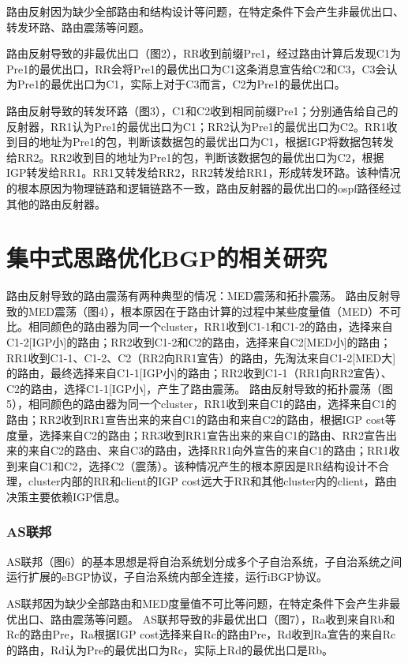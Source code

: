 \begin{itemize}
路由反射因为缺少全部路由和结构设计等问题，在特定条件下会产生非最优出口、转发环路、路由震荡等问题。

路由反射导致的非最优出口（图2），RR收到前缀Pre1，经过路由计算后发现C1为Pre1的最优出口，RR会将Pre1的最优出口为C1这条消息宣告给C2和C3，C3会认为Pre1的最优出口为C1，实际上对于C3而言，C2为Pre1的最优出口。

路由反射导致的转发环路（图3），C1和C2收到相同前缀Pre1；分别通告给自己的反射器，RR1认为Pre1的最优出口为C1；RR2认为Pre1的最优出口为C2。RR1收到目的地址为Pre1的包，判断该数据包的最优出口为C1，根据IGP将数据包转发给RR2。RR2收到目的地址为Pre1的包，判断该数据包的最优出口为C2，根据IGP转发给RR1。RR1又转发给RR2，RR2转发给RR1，形成转发环路。该种情况的根本原因为物理链路和逻辑链路不一致，路由反射器的最优出口的ospf路径经过其他的路由反射器。

\section{集中式思路优化BGP的相关研究}

路由反射导致的路由震荡有两种典型的情况：MED震荡和拓扑震荡。
路由反射导致的MED震荡（图4），根本原因在于路由计算的过程中某些度量值（MED）不可比。相同颜色的路由器为同一个cluster，RR1收到C1-1和C1-2的路由，选择来自C1-2[IGP小]的路由；RR2收到C1-2和C2的路由，选择来自C2[MED小]的路由；RR1收到C1-1、C1-2、C2（RR2向RR1宣告）的路由，先淘汰来自C1-2[MED大]的路由，最终选择来自C1-1[IGP小]的路由；RR2收到C1-1（RR1向RR2宣告）、C2的路由，选择C1-1[IGP小]，产生了路由震荡。
路由反射导致的拓扑震荡（图5），相同颜色的路由器为同一个cluster，RR1收到来自C1的路由，选择来自C1的路由；RR2收到RR1宣告出来的来自C1的路由和来自C2的路由，根据IGP cost等度量，选择来自C2的路由；RR3收到RR1宣告出来的来自C1的路由、RR2宣告出来的来自C2的路由、来自C3的路由，选择RR1向外宣告的来自C1的路由；RR1收到来自C1和C2，选择C2（震荡）。该种情况产生的根本原因是RR结构设计不合理，cluster内部的RR和client的IGP cost远大于RR和其他cluster内的client，路由决策主要依赖IGP信息。
\subsubsection{AS联邦}
AS联邦（图6）的基本思想是将自治系统划分成多个子自治系统，子自治系统之间运行扩展的eBGP协议，子自治系统内部全连接，运行iBGP协议。

AS联邦因为缺少全部路由和MED度量值不可比等问题，在特定条件下会产生非最优出口、路由震荡等问题。
AS联邦导致的非最优出口（图7），Ra收到来自Rb和Rc的路由Pre，Ra根据IGP cost选择来自Rc的路由Pre，Rd收到Ra宣告的来自Rc的路由，Rd认为Pre的最优出口为Rc，实际上Rd的最优出口是Rb。


\end{itemize}
